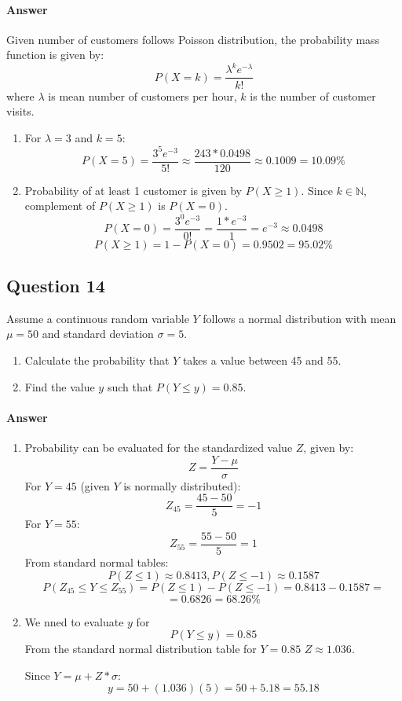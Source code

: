 \documentclass{article}
\begin{document}
\paragraph{Answer}

Given number of customers follows Poisson distribution, the probability mass function is given by:
$$P(X=k)=\frac{\lambda^k e^{-\lambda}}{k!}$$
where $\lambda$ is mean number of customers per hour, $k$ is the number of customer visits.
\begin{enumerate}
    \item For $\lambda = 3$ and $k = 5$:
    $$P(X=5)=\frac{3^5 e^{-3}}{5!} \approx \frac{243 * 0.0498}{120} \approx 0.1009 = 10.09\%$$
    \item Probability of at least 1 customer is given by $P(X\geq 1)$. Since $k \in \mathbb{N}$, complement of $P(X\geq 1)$ is $P(X= 0)$.
    $$P(X=0)=\frac{3^0 e^{-3}}{0!} =\frac{1 * e^{-3}}{1} = e^{-3} \approx 0.0498$$
    $$P(X\geq 1) = 1- P(X=0)= 0.9502 = 95.02\% $$
\end{enumerate}

\subsection{Question 14}
Assume a continuous random variable $ Y $ follows a normal distribution with mean $ \mu = 50 $ and standard deviation $ \sigma = 5 $.
\begin{enumerate}
    \item Calculate the probability that $ Y $ takes a value between 45 and 55.
    \item Find the value $ y $ such that $ P(Y \leq y) = 0.85 $.
\end{enumerate}

\paragraph{Answer}
\begin{enumerate}
    \item Probability can be evaluated for the standardized value $Z$, given by:
    $$Z = \frac{Y - \mu}{\sigma}$$
    For $Y=45$ (given $Y$ is normally distributed):
    $$Z_45 = \frac{45 - 50}{5}=-1$$
    For $Y=55$:
    $$Z_55 = \frac{55 - 50}{5}=1$$
    From standard normal tables:
    $$P(Z \leq 1) \approx 0.8413, P(Z \leq-1) \approx 0.1587 $$
    $$P(Z_45 \leq Y \leq Z_55) = P(Z \leq 1) - P(Z \leq-1) = 0.8413 - 0.1587 = $$
    $$= 0.6826 = 68.26\%$$
    \item We nned to evaluate $y$ for
    $$P(Y \leq y)=0.85$$
    From the standard normal distribution table for $Y=0.85$ $Z \approx 1.036$.
    
    Since $Y=\mu+Z* \sigma$:
    $$y=50+(1.036)(5)=50+5.18=55.18$$
\end{enumerate}
\end{document}
